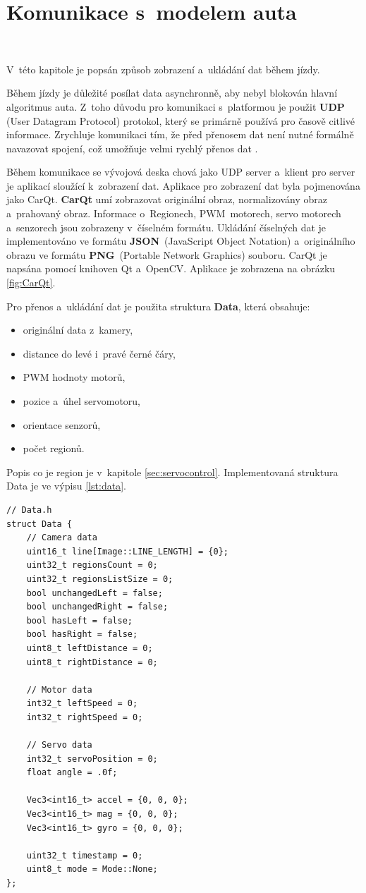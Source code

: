 \chapter{Komunikace s~modelem auta}
\label{sec:PlatformCommunication}
\

V~této kapitole je popsán způsob zobrazení a~ukládání dat během jízdy.

Během jízdy je důležité posílat data asynchronně, aby nebyl blokován hlavní
algoritmus auta. Z~toho důvodu pro komunikaci s~platformou je použit \textbf{UDP}
(User Datagram Protocol) protokol, který se primárně používá pro časově citlivé
informace. Zrychluje komunikaci tím, že před přenosem dat není nutné formálně
navazovat spojení, což umožňuje velmi rychlý přenos dat \cite{UDP}.

Během komunikace se vývojová deska chová jako UDP server a~klient pro server je
aplikací sloužící k~zobrazení dat. Aplikace pro zobrazení dat byla pojmenována jako
CarQt. \textbf{CarQt} umí zobrazovat originální obraz, normalizovány obraz
a~prahovaný obraz. Informace o~Regionech, PWM~motorech, servo motorech a~senzorech
jsou zobrazeny v~číselném formátu. Ukládání číselných dat je implementováno ve
formátu \textbf{JSON}~(JavaScript Object Notation) a~originálního obrazu ve formátu
\textbf{PNG}~(Portable Network Graphics) souboru. CarQt je napsána pomocí knihoven
Qt a~OpenCV. Aplikace je zobrazena na obrázku \ref{fig:CarQt}.

Pro přenos a~ukládání dat je použita struktura \textbf{Data}, která obsahuje:
\begin{itemize}
    \item originální data z~kamery,
    \item distance do levé i~pravé černé čáry,
    \item PWM hodnoty motorů,
    \item pozice a~úhel servomotoru,
    \item orientace senzorů,
    \item počet regionů.
\end{itemize}
Popis co je region je v~kapitole \ref{sec:servocontrol}.
Implementovaná struktura Data je ve výpisu \ref{lst:data}.
\begin{lstlisting}[caption = Struktura Data, label = lst:data]
// Data.h
struct Data {
    // Camera data
    uint16_t line[Image::LINE_LENGTH] = {0};
    uint32_t regionsCount = 0;
    uint32_t regionsListSize = 0;
    bool unchangedLeft = false;
    bool unchangedRight = false;
    bool hasLeft = false;
    bool hasRight = false;
    uint8_t leftDistance = 0;
    uint8_t rightDistance = 0;

    // Motor data
    int32_t leftSpeed = 0;
    int32_t rightSpeed = 0;

    // Servo data
    int32_t servoPosition = 0;
    float angle = .0f;

    Vec3<int16_t> accel = {0, 0, 0};
    Vec3<int16_t> mag = {0, 0, 0};
    Vec3<int16_t> gyro = {0, 0, 0};

    uint32_t timestamp = 0;
    uint8_t mode = Mode::None;
};
\end{lstlisting}

